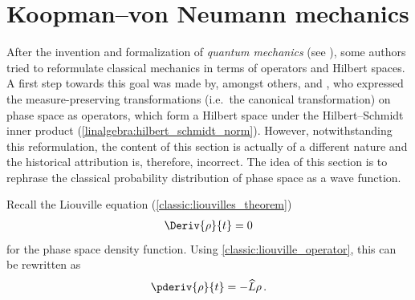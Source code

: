
\section{Koopman--von Neumann mechanics}

    After the invention and formalization of \textit{quantum mechanics} (see ), some authors tried to reformulate classical mechanics in terms of operators and Hilbert spaces. A first step towards this goal was made by, amongst others,  and , who expressed the measure-preserving transformations (i.e.~the canonical transformation) on phase space as operators, which form a Hilbert space under the Hilbert--Schmidt inner product (\cref{linalgebra:hilbert_schmidt_norm}). However, notwithstanding this reformulation, the content of this section is actually of a different nature and the historical attribution is, therefore, incorrect. The idea of this section is to rephrase the classical probability distribution of phase space as a wave function.

    Recall the Liouville equation (\cref{classic:liouvilles_theorem})
    \begin{gather}
        \Deriv{\rho}{t}=0
    \end{gather}
    for the phase space density function. Using \cref{classic:liouville_operator}, this can be rewritten as
    \begin{gather}
        \pderiv{\rho}{t} = -\widehat{L}\rho\,.
    \end{gather}

